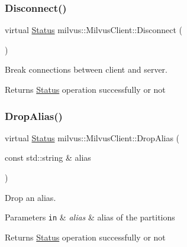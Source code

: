 \subsubsection{\texorpdfstring{Disconnect()}{Disconnect()}}
{\footnotesize\ttfamily virtual \hyperlink{classmilvus_1_1_status}{Status} milvus\+::\+Milvus\+Client\+::\+Disconnect (\begin{DoxyParamCaption}{ }\end{DoxyParamCaption})\hspace{0.3cm}{\ttfamily [pure virtual]}}

Break connections between client and server.

\begin{DoxyReturn}{Returns}
\hyperlink{classmilvus_1_1_status}{Status} operation successfully or not 
\end{DoxyReturn}
\mbox{\label{classmilvus_1_1_milvus_client_aef2fe7b13010cc57f5ae7235cf75252d}} 
\subsubsection{\texorpdfstring{Drop\+Alias()}{DropAlias()}}
{\footnotesize\ttfamily virtual \hyperlink{classmilvus_1_1_status}{Status} milvus\+::\+Milvus\+Client\+::\+Drop\+Alias (\begin{DoxyParamCaption}\item[{const std\+::string \&}]{alias }\end{DoxyParamCaption})\hspace{0.3cm}{\ttfamily [pure virtual]}}

Drop an alias.


\begin{DoxyParams}[1]{Parameters}
\mbox{\tt in}  & {\em alias} & alias of the partitions \\
\hline
\end{DoxyParams}
\begin{DoxyReturn}{Returns}
\hyperlink{classmilvus_1_1_status}{Status} operation successfully or not 
\end{DoxyReturn}
\mbox{\label{classmilvus_1_1_milvus_client_a95855ea21b38da54b65ce04f650b03ba}} 
